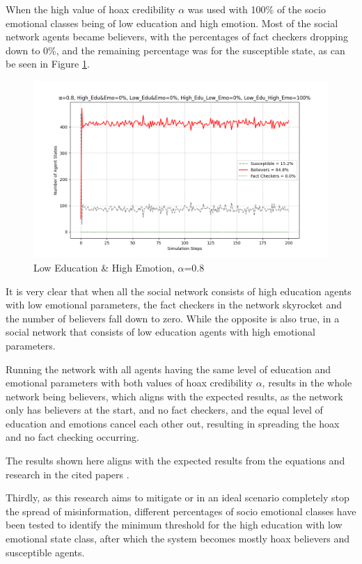 \documentclass[twocolumn, a4paper, 12pt]{article}
\begin{document}
When the high value of hoax credibility $\alpha$ was used with 100\% of the socio emotional classes being of low education and high emotion. Most of the social network agents became believers, with the percentages of fact checkers dropping down to 0\%, and the remaining percentage was for the susceptible state, as can be seen in Figure \ref{fig:6}.

\begin{figure}[H]
    \centering
    \includegraphics[width=1\linewidth]{0.8_alpha_all_low.png}
    \caption{Low Education \& High Emotion, $\alpha$=0.8}
    \label{fig:6}
\end{figure}


It is very clear that when all the social network consists of high education agents with low emotional parameters, the fact checkers in the network skyrocket and the number of believers fall down to zero. While the opposite is also true, in a social network that consists of low education agents with high emotional parameters.

Running the network with all agents having the same level of education and emotional parameters with both values of hoax credibility $\alpha$, results in the whole network being believers, which aligns with the expected results, as the network only has believers at the start, and no fact checkers, and the equal level of education and emotions cancel each other out, resulting in spreading the hoax and no fact checking occurring.

The results shown here aligns with the expected results from the equations and research in the cited papers \cite{simulation} \cite{emotion} \cite{education}.

Thirdly, as this research aims to mitigate or in an ideal scenario completely stop the spread of misinformation, different percentages of socio emotional classes have been tested to identify the minimum threshold for the high education with low emotional state class, after which the system becomes mostly hoax believers and susceptible agents.
\end{document}
